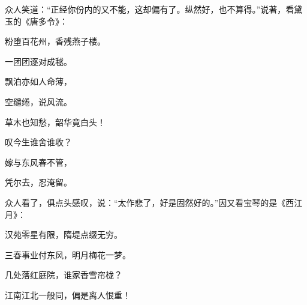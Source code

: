 \begin{parag}
    众人笑道：“正经你份内的又不能，这却偏有了。纵然好，也不算得。”说著，看黛玉的《唐多令》：
\end{parag}
\begin{poem}

    \begin{pl}

        粉堕百花州，香残燕子楼。
    \end{pl}
    \begin{pl}

        一团团逐对成毬。
    \end{pl}
    \begin{pl}

        飘泊亦如人命薄，
    \end{pl}
    \begin{pl}

        空缱绻，说风流。
    \end{pl}
    \begin{pl}

        草木也知愁，韶华竟白头！
    \end{pl}
    \begin{pl}

        叹今生谁舍谁收？
    \end{pl}
    \begin{pl}

        嫁与东风春不管，
    \end{pl}
    \begin{pl}

        凭尔去，忍淹留。
    \end{pl}
\end{poem}


\begin{parag}
    众人看了，俱点头感叹，说：“太作悲了，好是固然好的。”因又看宝琴的是《西江月》：
\end{parag}
\begin{poem}

    \begin{pl}

        汉苑零星有限，隋堤点缀无穷。
    \end{pl}
    \begin{pl}

        三春事业付东风，明月梅花一梦。
    \end{pl}
    \begin{pl}

        几处落红庭院，谁家香雪帘栊？
    \end{pl}
    \begin{pl}

        江南江北一般同，偏是离人恨重！
    \end{pl}
\end{poem}


